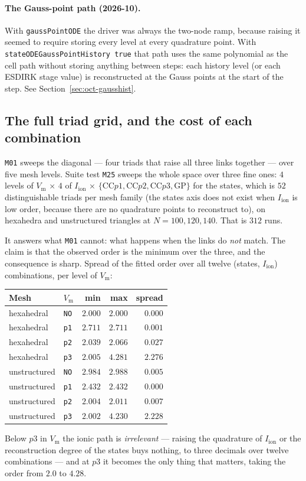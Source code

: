 \documentclass[11pt,a4paper]{article}
\newcommand{\code}[1]{\texttt{\small #1}}
\newcommand{\Vm}{V_{\text{m}}}
\newcommand{\Iion}{I_{\mathrm{ion}}}
\begin{document}
\paragraph{The Gauss-point path (2026-10).} With \code{gaussPointODE} the driver
was always the two-node ramp, because raising it seemed to require storing every
level at every quadrature point. With \code{stateODEGaussPointHistory true} that
path uses the same polynomial as the cell path without storing anything between
steps: each history level (or each ESDIRK stage value) is reconstructed at the
Gauss points at the start of the step. See Section~\ref{sec:oct-gausshist}.


\subsection{The full triad grid, and the cost of each combination}
\label{sec:m25}

\code{M01} sweeps the diagonal --- four triads that raise all three links
together --- over five mesh levels. Suite test \code{M25} sweeps the whole space
over three fine ones: $4$ levels of $\Vm$ $\times$ $4$ of $\Iion$ $\times$
$\{\mathrm{CC}p1,\mathrm{CC}p2,\mathrm{CC}p3,\mathrm{GP}\}$ for the states, which
is $52$ distinguishable triads per mesh family (the states axis does not exist when
$\Iion$ is low order, because there are no quadrature points to reconstruct to),
on hexahedra and unstructured triangles at $N=100,120,140$. That is $312$ runs.

It answers what \code{M01} cannot: what happens when the links do \emph{not}
match. The claim is that the observed order is the minimum over the three, and the
consequence is sharp. Spread of the fitted order over all twelve
(states, $\Iion$) combinations, per level of $\Vm$:
\begin{center}
\begin{tabular}{@{}llrrr@{}}
\toprule
Mesh & $\Vm$ & min & max & spread \\
\midrule
hexahedral   & \code{NO} & $2.000$ & $2.000$ & $0.000$ \\
hexahedral   & \code{p1} & $2.711$ & $2.711$ & $0.001$ \\
hexahedral   & \code{p2} & $2.039$ & $2.066$ & $0.027$ \\
hexahedral   & \code{p3} & $2.005$ & $4.281$ & $\mathbf{2.276}$ \\
unstructured & \code{NO} & $2.984$ & $2.988$ & $0.005$ \\
unstructured & \code{p1} & $2.432$ & $2.432$ & $0.000$ \\
unstructured & \code{p2} & $2.004$ & $2.011$ & $0.007$ \\
unstructured & \code{p3} & $2.002$ & $4.230$ & $\mathbf{2.228}$ \\
\bottomrule
\end{tabular}
\end{center}
Below $p3$ in $\Vm$ the ionic path is \emph{irrelevant} --- raising the quadrature
of $\Iion$ or the reconstruction degree of the states buys nothing, to three
decimals over twelve combinations --- and at $p3$ it becomes the only thing that
matters, taking the order from $2.0$ to $4.28$.
\end{document}

